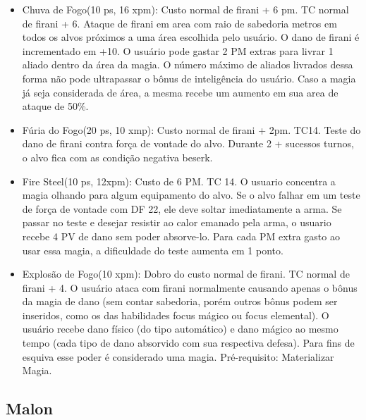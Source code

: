 \begin{itemize}
	\item Chuva de Fogo(10 ps, 16 xpm): Custo normal de firani + 6 pm. TC normal de firani + 6.\newline
Ataque de firani em area com raio de sabedoria metros em todos os alvos próximos a uma área escolhida pelo usuário. O dano de firani é incrementado em +10. O usuário pode gastar 2 PM extras para livrar 1 aliado dentro da área da magia. O número máximo de aliados livrados dessa forma não pode ultrapassar o bônus de inteligência do usuário. Caso a magia já seja considerada de área, a mesma recebe um aumento em sua area de ataque de 50\%.

	\item Fúria do Fogo(20 ps, 10 xmp): Custo normal de firani + 2pm. TC14.\newline
Teste do dano de firani contra força de vontade do alvo. Durante 2 + sucessos turnos, o alvo fica com as condição negativa beserk.

	\item Fire Steel(10 ps, 12xpm): Custo de 6 PM. TC 14.\newline
O usuario concentra a magia olhando para algum equipamento do alvo. Se o alvo falhar em um teste de força de vontade com DF 22, ele deve soltar imediatamente a arma. Se passar no teste e desejar resistir ao calor emanado pela arma, o usuario recebe 4 PV de dano sem poder absorve-lo. Para cada PM extra gasto ao usar essa magia, a dificuldade do teste aumenta em 1 ponto.  

	\item Explosão de Fogo(10 xpm): Dobro do custo normal de firani. TC normal de firani + 4. \newline
O usuário ataca com firani normalmente causando apenas o bônus da magia de dano (sem contar sabedoria, porém outros bônus podem ser inseridos, como os das habilidades focus mágico ou focus elemental). O usuário recebe dano físico (do tipo automático) e dano mágico ao mesmo tempo (cada tipo de dano absorvido com sua respectiva defesa). Para fins de esquiva esse poder é considerado uma magia. Pré-requisito: Materializar Magia.

\end{itemize}


\subsection{Malon}

